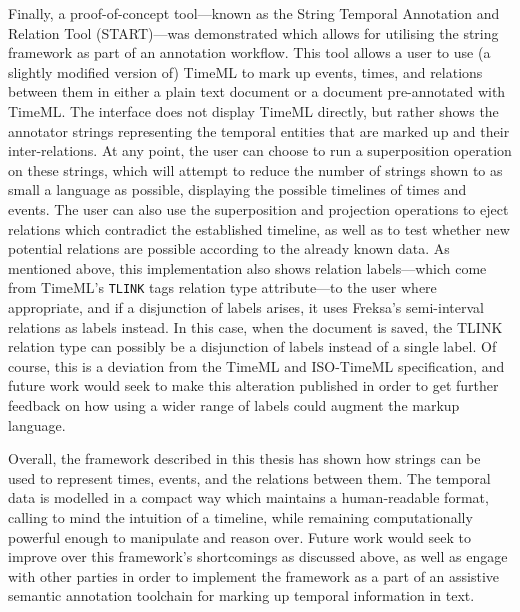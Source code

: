 \documentclass[a4paper,12pt,leqno]{article}
\begin{document}
Finally, a proof-of-concept tool---known as the String Temporal Annotation and Relation Tool (START)---was demonstrated which allows for utilising the string framework as part of an annotation workflow. This tool allows a user to use (a slightly modified version of) TimeML to mark up events, times, and relations between them in either a plain text document or a document pre-annotated with TimeML. The interface does not display TimeML directly, but rather shows the annotator strings representing the temporal entities that are marked up and their inter-relations. At any point, the user can choose to run a superposition operation on these strings, which will attempt to reduce the number of strings shown to as small a language as possible, displaying the possible timelines of times and events. The user can also use the superposition and projection operations to eject relations which contradict the established timeline, as well as to test whether new potential relations are possible according to the already known data. As mentioned above, this implementation also shows relation labels---which come from TimeML's \texttt{TLINK} tags relation type attribute---to the user where appropriate, and if a disjunction of labels arises, it uses Freksa's semi-interval relations as labels instead. In this case, when the document is saved, the TLINK relation type can possibly be a disjunction of labels instead of a single label. Of course, this is a deviation from the TimeML and ISO-TimeML specification, and future work would seek to make this alteration published in order to get further feedback on how using a wider range of labels could augment the markup language.

Overall, the framework described in this thesis has shown how strings can be used to represent times, events, and the relations between them. The temporal data is modelled in a compact way which maintains a human-readable format, calling to mind the intuition of a timeline, while remaining computationally powerful enough to manipulate and reason over. Future work would seek to improve over this framework's shortcomings as discussed above, as well as engage with other parties in order to implement the framework as a part of an assistive semantic annotation toolchain for marking up temporal information in text.

\end{document}

